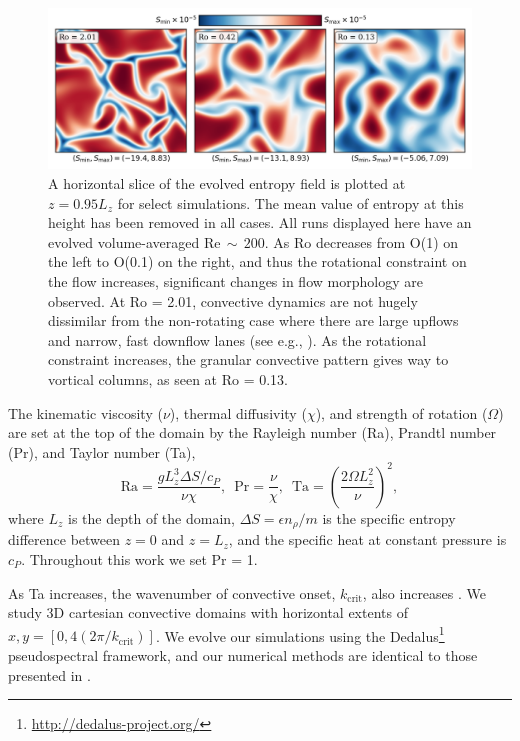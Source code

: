 \documentclass[twocolumn, amsmath, amsfonts, amssymb]{aastex62}
\begin{document}
\begin{figure}[t!]
\includegraphics[width=\textwidth]{dynamics_plot.png}
\caption{ A horizontal slice of the evolved entropy field is plotted at $z = 0.95L_z$
for select simulations. The mean value of entropy at this height has been removed in all
cases. All runs displayed here have an evolved volume-averaged Re$\,\sim\,200$. 
As Ro decreases from O(1) on the left to O(0.1) on the right, and thus the rotational
constraint on the flow increases, significant changes in flow morphology are observed.
At Ro = 2.01, convective dynamics are not hugely dissimilar from the non-rotating
case where there are large upflows and narrow, fast downflow lanes (see e.g., \AB).
As the rotational constraint increases, the granular convective pattern gives way
to vortical columns, as seen at Ro = 0.13.
\label{fig:pretty_convection} }
\end{figure}


The kinematic viscosity ($\nu$), thermal diffusivity ($\chi$), and strength of
rotation ($\Omega$) are set at the top of the domain by the Rayleigh number
(Ra), Prandtl number (Pr), and Taylor number (Ta),
\begin{equation}
\text{Ra} = \frac{g L_z^3 \Delta S / c_P}{\nu \chi}, \,\,\,
\text{Pr} = \frac{\nu}{\chi}, \,\,\,
\text{Ta} = \left(\frac{2 \Omega L_z^2}{\nu}\right)^2,
\end{equation}
where $L_z$ is the depth of the domain, 
$\Delta S = \epsilon n_\rho / m$ is the specific entropy difference between
$z = 0$ and $z = L_z$, and the specific heat at constant pressure is $c_P$.
Throughout this work we set Pr = 1.

As Ta increases, the wavenumber of convective onset, $k_{\text{crit}}$, also increases
\citep{calkins&all2015}. 
We study 3D cartesian convective domains with horizontal extents of
$x, y = [0, 4(2\pi/k_{\text{crit}})]$. 
We evolve our simulations using the Dedalus\footnote{\url{http://dedalus-project.org/}} 
pseudospectral framework, and our numerical methods are identical to those presented
in \AB.
\end{document}
